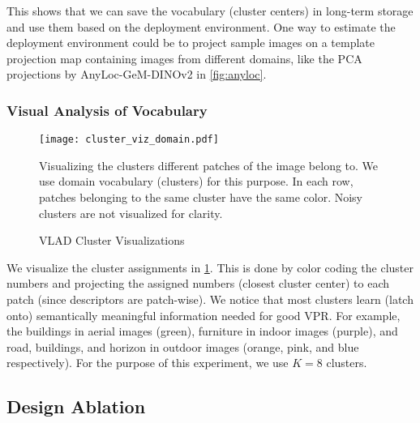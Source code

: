 This shows that we can save the vocabulary (cluster centers) in
long-term storage and use them based on the deployment environment.
One way to estimate the deployment environment could be to project
sample images on a template projection map containing images from
different domains, like the PCA projections by AnyLoc-GeM-DINOv2 in
\cref{fig:anyloc}.

\subsubsection{Visual Analysis of Vocabulary}

\begin{figure}
    \centering
    \texttt{[image: cluster\_viz\_domain.pdf]}
    \caption{VLAD Cluster Visualizations}
    \small
        Visualizing the clusters different patches of the image belong
        to. We use domain vocabulary (clusters) for this purpose. In 
        each row, patches belonging to the same cluster have the same 
        color. Noisy clusters are not visualized for clarity.
    \label{fig:anyloc_cluster_viz}
\end{figure}

We visualize the cluster assignments in \cref{fig:anyloc_cluster_viz}.
This is done by color coding the cluster numbers and projecting the
assigned numbers (closest cluster center) to each patch (since
descriptors are patch-wise). We notice that most clusters learn (latch
onto) semantically meaningful information needed for good VPR. For
example, the buildings in aerial images (green), furniture in indoor
images (purple), and road, buildings, and horizon in outdoor images
(orange, pink, and blue respectively). For the purpose of this
experiment, we use $K = 8$ clusters.

\subsection{Design Ablation}

